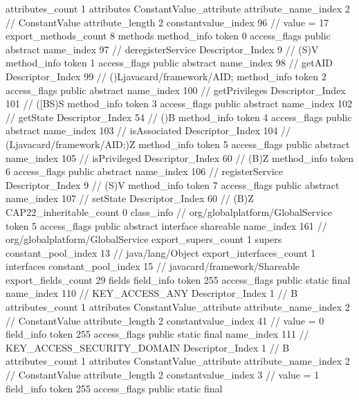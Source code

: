 {{{{{				attributes_count	1
				attributes {
				ConstantValue_attribute {
					attribute_name_index	2		// ConstantValue
					attribute_length	2
					constantvalue_index	96		// value = 17
				}
				}
			}
			}
			export_methods_count	8
			methods {
				method_info {
					token	0
					access_flags	public abstract
					name_index	97		// deregisterService
					Descriptor_Index	9		// (S)V
				}
				method_info {
					token	1
					access_flags	public abstract
					name_index	98		// getAID
					Descriptor_Index	99		// ()Ljavacard/framework/AID;
				}
				method_info {
					token	2
					access_flags	public abstract
					name_index	100		// getPrivileges
					Descriptor_Index	101		// ([BS)S
				}
				method_info {
					token	3
					access_flags	public abstract
					name_index	102		// getState
					Descriptor_Index	54		// ()B
				}
				method_info {
					token	4
					access_flags	public abstract
					name_index	103		// isAssociated
					Descriptor_Index	104		// (Ljavacard/framework/AID;)Z
				}
				method_info {
					token	5
					access_flags	public abstract
					name_index	105		// isPrivileged
					Descriptor_Index	60		// (B)Z
				}
				method_info {
					token	6
					access_flags	public abstract
					name_index	106		// registerService
					Descriptor_Index	9		// (S)V
				}
				method_info {
					token	7
					access_flags	public abstract
					name_index	107		// setState
					Descriptor_Index	60		// (B)Z
				}
			}
			CAP22_inheritable_count	0
		}
		class_info {		// org/globalplatform/GlobalService
			token	5
			access_flags	public abstract interface shareable
			name_index	161		// org/globalplatform/GlobalService
			export_supers_count	1
			supers {
				constant_pool_index	13		// java/lang/Object
			}
			export_interfaces_count	1
			interfaces {
				constant_pool_index	15		// javacard/framework/Shareable
			}
			export_fields_count	29
			fields {
			field_info {
				token	255
				access_flags	public static final
				name_index	110		// KEY_ACCESS_ANY
				Descriptor_Index	1		// B
				attributes_count	1
				attributes {
				ConstantValue_attribute {
					attribute_name_index	2		// ConstantValue
					attribute_length	2
					constantvalue_index	41		// value = 0
				}
				}
			}
			field_info {
				token	255
				access_flags	public static final
				name_index	111		// KEY_ACCESS_SECURITY_DOMAIN
				Descriptor_Index	1		// B
				attributes_count	1
				attributes {
				ConstantValue_attribute {
					attribute_name_index	2		// ConstantValue
					attribute_length	2
					constantvalue_index	3		// value = 1
				}
				}
			}
			field_info {
				token	255
				access_flags	public static final
}}}}}
